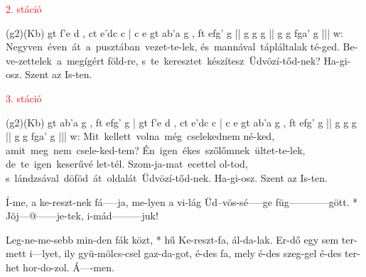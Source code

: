 \documentclass[twoside]{article}
\begin{document}
\textcolor{red}{2. stáció}

\begin{aretino}
(g2)(Kb) gt f'e d , ct e'dc c | c e gt ab'a g , ft efg' g || g g g || g g fga' g |||
w: Negyven~éven~át~a~pusztában~vezet-te-lek, és~mannával~tápláltalak té-ged. Be-ve-zettelek~a~megígért föld-re, s~te~keresztet~készítesz~Üdvözí-tőd-nek? Ha-gi-osz. Szent az Is-ten.
\end{aretino}

\textcolor{red}{3. stáció}

\begin{aretino}
(g2)(Kb) gt ab'a g , ft efg' g | gt f'e d , ct e'dc c | c e gt ab'a g , ft efg' g || g g g || g g fga' g |||
w: Mit~kellett~volna~még~cselekednem né-ked, amit~meg~nem~csele-ked-tem? Én~igen~ékes~szőlőmnek~ültet-te-lek, de~te~igen~keserűvé let-tél. Szom-ja-mat~ecettel ol-tod, s~lándzsával~döföd~át~oldalát~Üdvözí-tőd-nek. Ha-gi-osz. Szent az Is-ten.
\end{aretino}



\begin{gregosheet}
            {   Í-me, a  ke-reszt-nek fá-----ja,   me-lyen a vi-lág Üd--vös-sé-----ge    füg------------gött. * Jöj---@------je-tek, i-mád---------juk!}
\end{gregosheet}



\begin{gregosheet}
            {   Leg-ne-me-sebb min-den fák közt, * hű  Ke-reszt-fa, ál-da-lak.    Er-dő egy sem ter-mett i---lyet, ily gyü-mölcs-csel gaz-da-got,      é-des fa, mely é-des szeg-gel é-des ter-het hor-do-zol. Á----men.}
\end{gregosheet}
\end{document}
